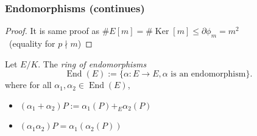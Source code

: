 \documentclass[12pt,handout]{beamer} %
\theoremstyle{definition}
\begin{document}
\begin{frame}
\frametitle{Endomorphisms (continues)}

\pause

\begin{proof}
It is same proof as $\#E[m]=\#\operatorname{Ker}[m]\le\partial\phi_m= m^2$\pause \\ \ \hfill (equality for $p\nmid m$)
\end{proof}\pause

\begin{Definition} Let $E/K$. The \emph{ring of endomorphisms}
\alert{$$\operatorname{End}(E):=\{\alpha: E\rightarrow E, \alpha\text{ is an endomorphism}\}.$$}
where for all $\alpha_1,\alpha_2\in\operatorname{End}(E)$,\pause
\begin{itemize}[<+-|alert@+>]
  \item $(\alpha_1+\alpha_2)P:=\alpha_1(P)+_E\alpha_2(P)$
  \item $(\alpha_1\alpha_2)P=\alpha_1(\alpha_2(P))$
\end{itemize}
\end{Definition}
\end{frame}
\end{document}
